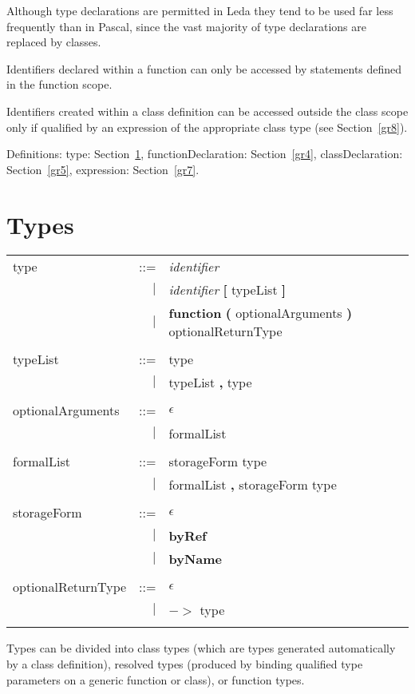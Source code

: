 Although type declarations are permitted in Leda they tend to be used
far less frequently than in Pascal, since the vast majority of type
declarations are replaced by classes.

Identifiers declared within a function can only be accessed by statements
defined in the function scope.

Identifiers created within a class definition can be accessed outside
the class scope only if qualified by an expression of the appropriate
class type (see Section~\ref{gr8}).

Definitions:
type: Section~\ref{gr3},
functionDeclaration: Section~\ref{gr4},
classDeclaration: Section~\ref{gr5},
expression: Section~\ref{gr7}.

\section{Types}\label{gr3}

\begin{tabular}{l r l}
type & ::= & {\em identifier} \\
& $\mid$ & {\em identifier} {\bf [} typeList {\bf ]} \\
& $\mid$ & {\bf function} {\bf (} optionalArguments {\bf )} optionalReturnType \\ \\
typeList & ::= & type \\
& $\mid$ & typeList {\bf ,} type \\ \\
optionalArguments & ::= & $\epsilon$ \\
& $\mid$ & formalList \\ \\
formalList & ::= & storageForm type \\
& $\mid$ & formalList {\bf ,} storageForm type \\ \\
storageForm & ::= & $\epsilon$ \\
& $\mid$ & {\bf byRef} \\
& $\mid$ & {\bf byName} \\ \\
optionalReturnType & ::= & $\epsilon$ \\
& $\mid$ & {\bf $-\!{}>$} type \\ \\
\end{tabular}

Types can be divided into class types (which are types generated
automatically by a class definition), resolved types (produced
by binding qualified type parameters on a generic function or class),
or function types.

